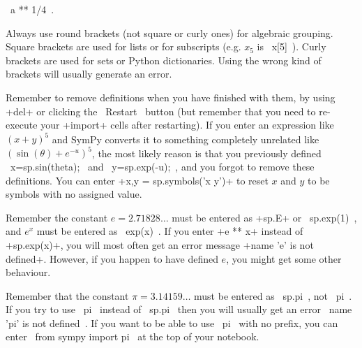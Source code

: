\documentclass[a4paper,10pt]{amsbook}
\begin{document}
\begin{secenum}
  \pcode~a ** 1/4~. 
%
 \item\label{shape} Always use round brackets (not square or curly
         ones) for algebraic grouping.  Square brackets are
         used for lists or for subscripts (e.g. $x_5$ is
         \pcode~x[5]~).  Curly brackets are used for sets or Python
         dictionaries. Using the wrong kind of brackets will usually
         generate an error. 
%
 \item\label{removedefs} Remember to remove definitions when you
  have finished with  them, by using \pcode+del+ or clicking the
  \pcode~Restart~ button (but remember that you need to re-execute 
  your \pcode+import+ cells after restarting).  If you enter an expression like $(x+y)^5$
  and SymPy converts it to something completely unrelated like
  $(\sin(\theta)+e^{-u})^5$, the most likely reason is that
  you previously defined \pcode~x=sp.sin(theta);~ and
  \pcode~y=sp.exp(-u);~, and you forgot to remove these
  definitions.  You can enter 
  \pcode+x,y = sp.symbols('x y')+ to reset $x$ and $y$ to be 
  symbols with no assigned value.
%
 \item\label{badexp} Remember the constant $e=2.71828\dots$ must be
  entered as \pcode+sp.E+ or \pcode~sp.exp(1)~, and $e^x$ must be entered as
  \pcode~exp(x)~.  If you enter \pcode+e ** x+ instead of \pcode+sp.exp(x)+,
  you will most often get an error message
  \pcode+name 'e' is not defined+.  However, if you happen to have
  defined $e$, you might get some other behaviour.
%
 \item\label{badpiagain} Remember that the constant $\pi=3.14159\dots$
  must be entered as \pcode~sp.pi~, not \pcode~pi~.  If you try to use
  \pcode~pi~ instead of \pcode~sp.pi~ then you will usually get an
  error \pcode~name 'pi' is not defined~.  If you want to be able to
  use \pcode~pi~ with no prefix, you can enter
  \pcode~from sympy import pi~ at the top of your notebook.
\end{secenum}
\end{document}
